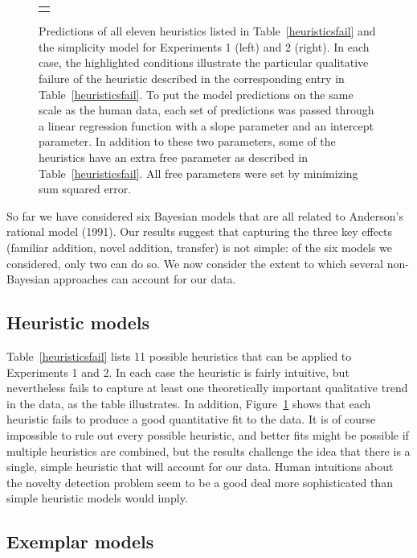 \documentclass[doc]{apa6}
\begin{document}
\begin{figure}[p]
\begin{tabular}{|cc|cc|}
\multicolumn{4}{c}{}
\end{tabular}
\caption{Predictions of all eleven heuristics listed in Table~\protect\ref{heuristicsfail} and the simplicity model for Experiments 1 (left) and 2 (right).
In each case, the highlighted conditions illustrate the particular qualitative failure of the heuristic described in the corresponding entry in Table~\protect\ref{heuristicsfail}.
To put the model predictions on the same scale as the human data, each set of predictions was passed through a linear regression function with a slope parameter and an intercept parameter. In addition to these two parameters, some of the heuristics have an extra free parameter as described in Table~\protect\ref{heuristicsfail}. All free parameters were set by minimizing sum squared error.}
\label{heuristicpics}
\end{figure}

So far we have considered six Bayesian models that are all related to Anderson's rational model (1991). Our results suggest that capturing the three key effects (familiar addition, novel addition, transfer) is not simple: of the six models we considered, only two can do so. We now consider the extent to which several non-Bayesian approaches can account for our data.

\subsection{Heuristic models}

Table~\ref{heuristicsfail} lists 11 possible heuristics that can be applied to Experiments 1 and 2. In each case the heuristic is fairly intuitive, but nevertheless fails to capture at least one theoretically important qualitative trend in the data, as the table illustrates. In addition, Figure~\ref{heuristicpics} shows that each heuristic fails to produce a good quantitative fit to the data.
It is of course impossible to rule out every possible heuristic, and better fits might be possible if multiple heuristics are combined, but the results challenge the idea that there is a single, simple heuristic that will account for our data. Human intuitions about the novelty detection problem seem to be a good deal more sophisticated than simple heuristic models would imply.

\subsection{Exemplar models}
\end{document}
